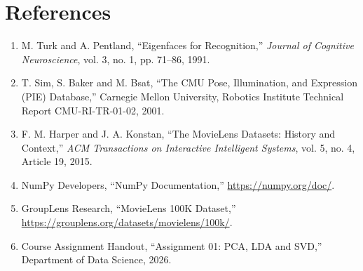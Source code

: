 \documentclass[12pt,a4paper]{report}
\begin{document}
\chapter*{References}
\begin{enumerate}
    \item M. Turk and A. Pentland, ``Eigenfaces for Recognition,'' \textit{Journal of Cognitive Neuroscience}, vol. 3, no. 1, pp. 71--86, 1991.
    \item T. Sim, S. Baker and M. Bsat, ``The CMU Pose, Illumination, and Expression (PIE) Database,'' Carnegie Mellon University, Robotics Institute Technical Report CMU-RI-TR-01-02, 2001.
    \item F. M. Harper and J. A. Konstan, ``The MovieLens Datasets: History and Context,'' \textit{ACM Transactions on Interactive Intelligent Systems}, vol. 5, no. 4, Article 19, 2015.
    \item NumPy Developers, ``NumPy Documentation,'' \url{https://numpy.org/doc/}.
    \item GroupLens Research, ``MovieLens 100K Dataset,'' \url{https://grouplens.org/datasets/movielens/100k/}.
    \item Course Assignment Handout, ``Assignment 01: PCA, LDA and SVD,'' Department of Data Science, 2026.
\end{enumerate}
\end{document}
